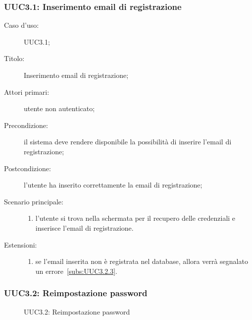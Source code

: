 \documentclass[../../../analisi-dei-requisiti.tex]{subfiles}
\begin{document}
\subsubsection{UUC3.1: Inserimento email di registrazione}%
\label{subs:UUC3.1}
\begin{description}
  \item[Caso d'uso:] UUC3.1;
  \item[Titolo:] Inserimento email di registrazione;
  \item[Attori primari:] utente non autenticato;
  \item[Precondizione:] il sistema deve rendere disponibile la possibilità di inserire l'email di registrazione;
  \item[Postcondizione:] l'utente ha inserito correttamente la email di registrazione;
  \item[Scenario principale:]
        \begin{enumerate}
          \item l'utente si trova nella schermata per il recupero delle credenziali e inserisce l'email di registrazione.
        \end{enumerate}
  \item[Estensioni:]
        \begin{enumerate}
          \item se l'email inserita non è registrata nel database, allora verrà segnalato un errore~\ref{subs:UUC3.2.3}.
        \end{enumerate}
\end{description}

\subsubsection{UUC3.2: Reimpostazione password}%
\label{subs:UUC3.2}

\begin{figure}[H]
  \centering
  \caption{UUC3.2: Reimpostazione password}%
  \label{fig:uuc3.2}
\end{figure}
\end{document}
